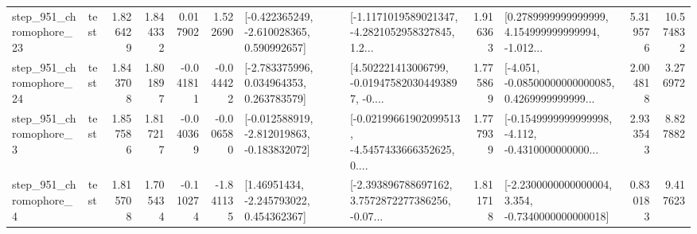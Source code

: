\begin{tabular}{llrrrrllrlrr}
  step\_951\_chromophore\_23 &      test &      1.826429 &    1.844332 &      0.017902 &  1.522690 &   [-0.422365249, -2.610028365, 0.590992657] &  [-1.1171019589021347, -4.2821052958327845, 1.2... &       1.916363 &  [0.2789999999999999, 4.154999999999994, -1.012... &            5.319576 &         10.574832 \\
  step\_951\_chromophore\_24 &      test &      1.843708 &    1.801897 &     -0.041811 & -0.044422 &    [-2.783375996, 0.034964353, 0.263783579] &  [4.502221413006799, -0.019475820304493897, -0.... &       1.775869 &  [-4.051, -0.08500000000000085, 0.4269999999999... &            2.004818 &          3.276972 \\
   step\_951\_chromophore\_3 &      test &      1.857586 &    1.817217 &     -0.040369 & -0.006580 &  [-0.012588919, -2.812019863, -0.183832072] &  [-0.02199661902099513, -4.5457433666352625, 0.... &       1.777939 &  [-0.1549999999999998, -4.112, -0.4310000000000... &            2.933543 &          8.827882 \\
   step\_951\_chromophore\_4 &      test &      1.815708 &    1.705434 &     -0.110274 & -1.841135 &     [1.46951434, -2.245793022, 0.454362367] &  [-2.393896788697162, 3.7572872277386256, -0.07... &       1.811718 &  [-2.2300000000000004, 3.354, -0.7340000000000018] &            0.830183 &          9.417623 \\
\bottomrule
\end{tabular}

